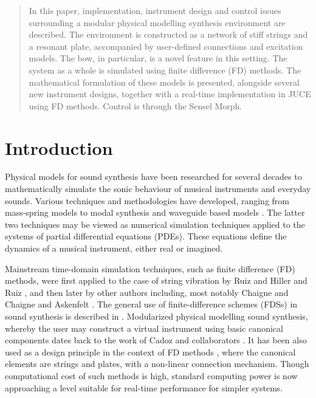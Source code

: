 \begin{abstract}
In this paper, implementation, instrument design and control issues surrounding a modular physical modelling synthesis environment are described. The environment is constructed as a network of stiff strings and a resonant plate, accompanied by user-defined connections and excitation models. The bow, in particular, is a novel feature in this setting. The system as a whole is simulated using finite difference (FD) methods. The mathematical formulation of these models is presented, alongside several new instrument designs, together with a real-time implementation in JUCE using FD methods. Control is through the Sensel Morph.  
\end{abstract}
%

\section{Introduction}\label{sec:introduction}

Physical models for sound synthesis have been researched for several decades to mathematically simulate the sonic behaviour of musical instruments and everyday sounds. Various techniques and methodologies have developed, ranging from mass-spring models \cite{cadoz79, Cadoz83, cadoz1993cordis} to modal synthesis \cite{morrison1993mosaic} and waveguide based models \cite{smith1992physical}. The latter two techniques may be viewed as numerical simulation techniques applied to the systems of partial differential equations (PDEs). These equations define the dynamics of a musical instrument, either real or imagined.

Mainstream time-domain simulation techniques, such as finite difference (FD) methods, were first applied to the case of string vibration by Ruiz \cite{Ruiz} and Hiller and Ruiz \cite{Hiller, Hiller2}, and then later by other authors \cite{Bacon} including, most notably Chaigne \cite{Chaigne92} and Chaigne and Askenfelt \cite{Chaigne}. The general use of finite-difference schemes (FDSs) in sound synthesis is described in \cite{Bilbao2009:NumericalSoundSynthesis}. Modularized physical modelling sound synthesis, whereby the user may construct a virtual instrument using basic canonical components dates back to the work of Cadoz and collaborators \cite{cadoz79, Cadoz83, cadoz1993cordis}. It has been also used as a design principle in the context of FD methods \cite{Bilbao2009:ModularPercussion, Bilbaosmc14, Webb2015}, where the canonical elements are strings and plates, with a non-linear connection mechanism.  Though computational cost of such methods is high, standard computing power is now approaching a level suitable for real-time performance for simpler systems.  

